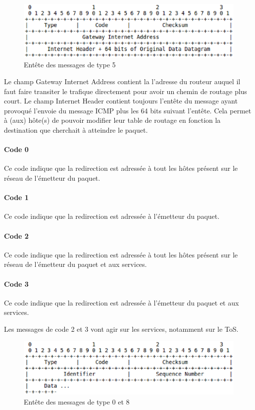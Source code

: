 \begin{figure}[h]
\centering
\includegraphics[width=13cm]{./pics/header2.eps}
\caption{Entête des messages de type 5}
\label{fig:head2icmp}
\end{figure}
Le champ Gateway Internet Address contient la l'adresse du routeur auquel il
faut faire transiter le trafique directement pour avoir un chemin de routage
plus court.  Le champ Internet Header contient toujours l'entête du message
ayant provoqué l'envoie du message ICMP plus les 64 bits suivant l'entête. Cela
permet à (aux) hôte(s) de pouvoir modifier leur table de routage en fonction la
destination que cherchait à atteindre le paquet.

\paragraph{Code 0}
Ce code indique que la redirection est adressée à tout les hôtes présent sur le
réseau de l'émetteur du paquet.

\paragraph{Code 1}
Ce code indique que la redirection est adressée à l'émetteur du paquet.

\paragraph{Code 2}
Ce code indique que la redirection est adressée à tout les hôtes présent sur le
réseau de l'émetteur du paquet et aux services.

\paragraph{Code 3} Ce code indique que la redirection est adressée à l'émetteur
du paquet et aux services.

Les messages de code 2 et 3 vont agir sur les services, notamment sur le ToS.

\begin{figure}[h]
\centering
\includegraphics[width=13cm]{./pics/header3.eps}
\caption{Entête des messages de type 0 et 8}
\label{fig:head3icmp}
\end{figure}

